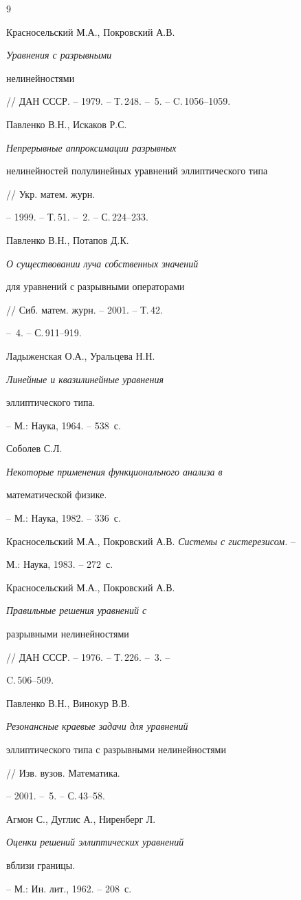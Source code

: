 \begin{thebibliography}{9}







Красносельский М.А., Покровский А.В. {\it Уравнения с разрывными


нелинейностями} // ДАН СССР. -- 1979. -- Т.\,248. -- \No\,5. -- C.\,1056--1059.




Павленко В.Н., Искаков Р.С. {\it Непрерывные аппроксимации разрывных


нелинейностей полулинейных уравнений эллиптического типа} // Укр. матем. журн.


-- 1999. -- Т.\,51. -- \No\,2. -- С.\,224--233.




Павленко В.Н., Потапов Д.К. {\it О существовании луча собственных значений


для уравнений с разрывными операторами} // Сиб. матем. журн. -- 2001. -- Т.\,42.


-- \No\,4. -- С.\,911--919.




Ладыженская О.А., Уральцева Н.Н. {\it Линейные и квазилинейные уравнения


эллиптического типа.} -- М.: Наука, 1964. -- 538~с.




Соболев С.Л. {\it Некоторые применения функционального анализа в


математической физике.} -- М.: Наука, 1982. -- 336~с.




Красносельский М.А., Покровский А.В. {\it Системы с гистерезисом.} --


М.: Наука, 1983. -- 272~с.




Красносельский М.А., Покровский А.В. {\it Правильные решения уравнений с


разрывными нелинейностями} // ДАН СССР. -- 1976. -- Т.\,226. -- \No\,3. --


C.\,506--509.




Павленко В.Н., Винокур В.В. {\it Резонансные краевые задачи для уравнений


эллиптического типа с разрывными нелинейностями} // Изв. вузов. Математика. 


-- 2001. -- \No\,5. -- С.\,43--58.




Агмон С., Дуглис А., Ниренберг Л. {\it Оценки решений эллиптических уравнений


вблизи границы.} -- М.: Ин. лит., 1962. -- 208~с.





\end{thebibliography}





